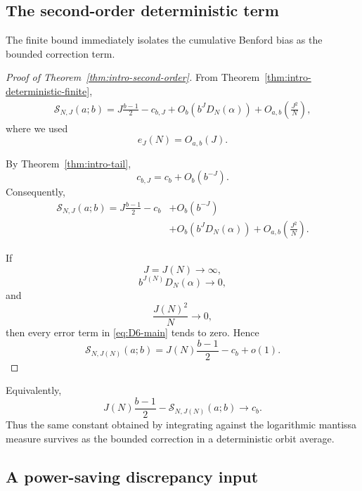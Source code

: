 \documentclass[11pt]{article}
\theoremstyle{definition}
\theoremstyle{remark}
\begin{document}
\subsection{The second-order deterministic term}
\label{subsec:second-order-deterministic}

The finite bound immediately isolates the cumulative Benford bias as
the bounded correction term.

\begin{proof}[Proof of
Theorem~\ref{thm:intro-second-order}]
From
Theorem~\ref{thm:intro-deterministic-finite},
\[
\begin{aligned}
    \mathcal S_{N,J}(a;b)
    =
    J\frac{b-1}{2}
    -
    c_{b,J}
    +
    O_b\!\left(b^JD_N(\alpha)\right)
    +
    O_{a,b}\!\left(\frac{J^2}{N}\right),
\end{aligned}
\label{eq:pre-D6}
\]
where we used
\[
    e_J(N)=O_{a,b}(J).
\]

By
Theorem~\ref{thm:intro-tail},
\[
    c_{b,J}
    =
    c_b+O_b(b^{-J}).
\]
Consequently,
\begin{equation}
\boxed{
\begin{aligned}
    \mathcal S_{N,J}(a;b)
    =
    J\frac{b-1}{2}
    -
    c_b
    &+
    O_b(b^{-J})
    \\
    &+
    O_b\!\left(b^JD_N(\alpha)\right)
    +
    O_{a,b}\!\left(\frac{J^2}{N}\right).
\end{aligned}
}
\label{eq:D6-main}
\end{equation}

If
\[
    J=J(N)\longrightarrow\infty,
\]
\[
    b^{J(N)}D_N(\alpha)\longrightarrow0,
\]
and
\[
    \frac{J(N)^2}{N}\longrightarrow0,
\]
then every error term in
\eqref{eq:D6-main} tends to zero.  Hence
\[
\boxed{
    \mathcal S_{N,J(N)}(a;b)
    =
    J(N)\frac{b-1}{2}
    -
    c_b
    +
    o(1).
}
\]
\end{proof}

Equivalently,
\begin{equation}
\boxed{
    J(N)\frac{b-1}{2}
    -
    \mathcal S_{N,J(N)}(a;b)
    \longrightarrow
    c_b.
}
\label{eq:cb-deterministic-limit}
\end{equation}
Thus the same constant obtained by integrating against the logarithmic
mantissa measure survives as the bounded correction in a deterministic
orbit average.


\subsection{A power-saving discrepancy input}
\label{subsec:power-saving-discrepancy}
\end{document}

